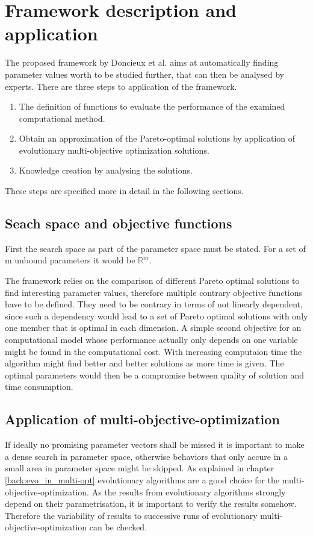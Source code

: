 \documentclass[12pt,twoside]{article}
\theoremstyle{plain}
\theoremstyle{definition}
\theoremstyle{remark}
\begin{document}
\section{Framework description and application}
\label{sec:model}
The proposed framework by Doncieux et al. \cite{doncieux2015multi} aims at automatically finding parameter values worth to be studied further, that can then be analysed by experts.
There are three steps to application of the framework.
\begin{enumerate}
	\item The definition of functions to evaluate the performance of the examined computational method.
	\item Obtain an approximation of the Pareto-optimal solutions by application of evolutionary multi-objective optimization solutions.
	\item Knowledge creation by analysing the solutions.
\end{enumerate}
These steps are specified more in detail in the following sections.

\subsection{Seach space and objective functions}
First the search space as part of the parameter space must be stated. For a set of m unbound parameters it would be $\mathbb{R}^m$. 

The framework relies on the comparison of different Pareto optimal solutions to find interesting parameter values, therefore multiple contrary objective functions have to be defined.
They need to be contrary in terms of not linearly dependent, since such a dependency would lead to a set of Pareto optimal solutions with only one member that is optimal in each dimension.
A simple second objective for an computational model whose performance actually only depends on one variable might be found in the computational cost.
With increasing computaion time the algorithm might find better and better solutions as more time is given. The optimal parameters would then be a compromise between quality of solution and time consumption.

\subsection{Application of multi-objective-optimization}
If ideally no promising parameter vectors shall be missed it is important to make a dense search in parameter space, otherwise behaviors that only accure in a small area in parameter space might be skipped.
As explained in chapter \ref{back:evo_in_multi-opt} evolutionary algorithms are a good choice for the multi-objective-optimization.
As the results from evolutionary algorithms strongly depend on their parametrisation, it is important to verify the results somehow.
Therefore the variability of results to successive runs of evolutionary multi-objective-optimization can be checked.
\end{document}

